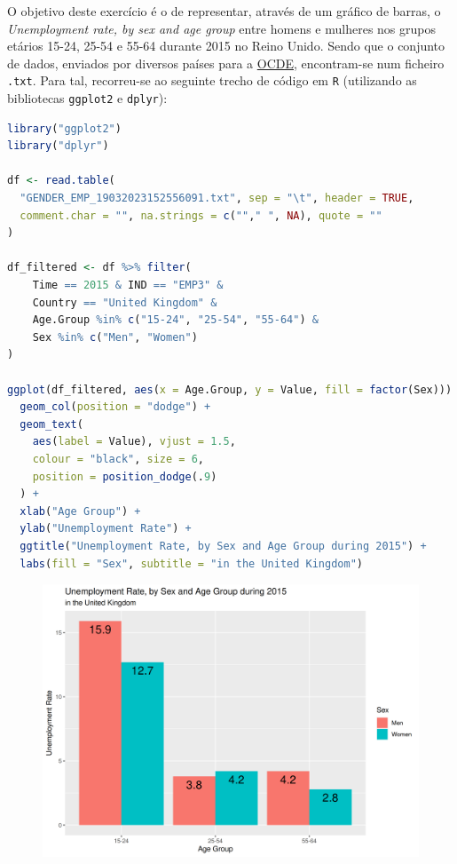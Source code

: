 \documentclass[12pt,a4paper]{article}
\begin{document}
O objetivo deste exercício é o de representar, através de um gráfico de barras, o \textit{Unemployment rate, by sex and age group}
entre homens e mulheres nos grupos etários 15-24, 25-54 e 55-64 durante 2015 no Reino Unido.
Sendo que o conjunto de dados, enviados por diversos países para a \href{https://stats.oecd.org/Index.aspx?DataSetCode=TIME_USE}{OCDE}, encontram-se num ficheiro \texttt{.txt}.
Para tal, recorreu-se ao seguinte trecho de código em \texttt{R} (utilizando as bibliotecas \texttt{ggplot2} e \texttt{dplyr}):

\quad

\begin{lstlisting}[language=R]
library("ggplot2")
library("dplyr")

df <- read.table(
  "GENDER_EMP_19032023152556091.txt", sep = "\t", header = TRUE,
  comment.char = "", na.strings = c(""," ", NA), quote = ""
)

df_filtered <- df %>% filter(
    Time == 2015 & IND == "EMP3" &
    Country == "United Kingdom" &
    Age.Group %in% c("15-24", "25-54", "55-64") &
    Sex %in% c("Men", "Women")
)

ggplot(df_filtered, aes(x = Age.Group, y = Value, fill = factor(Sex))) +
  geom_col(position = "dodge") +
  geom_text(
    aes(label = Value), vjust = 1.5,
    colour = "black", size = 6,
    position = position_dodge(.9)
  ) +
  xlab("Age Group") +
  ylab("Unemployment Rate") +
  ggtitle("Unemployment Rate, by Sex and Age Group during 2015") +
  labs(fill = "Sex", subtitle = "in the United Kingdom")
\end{lstlisting}

\quad

\begin{figure}[h]
  \centering
  \includegraphics[scale = 0.8]{./ex03.png}
\end{figure}
\end{document}
